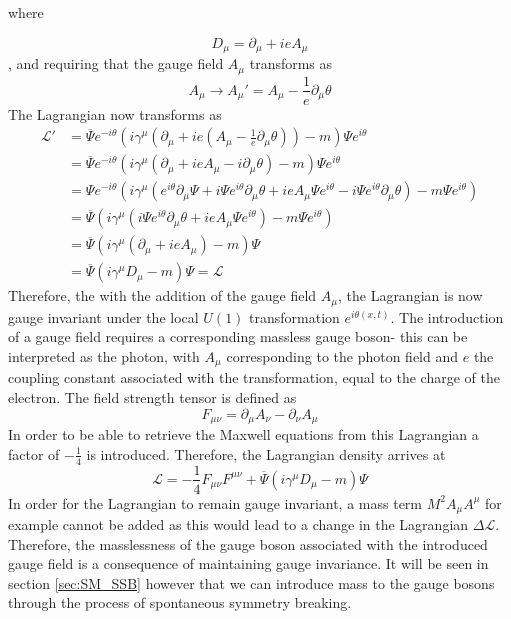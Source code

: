 \documentclass{article}
\begin{document}
where 

\begin{equation}
D_\mu = \partial_\mu + ieA_\mu
\end{equation}
, and requiring that the gauge field $A_\mu$ transforms as
\begin{equation}
A_\mu \rightarrow A_\mu' = A_\mu - \frac{1}{e}\partial_\mu \theta
\end{equation}
The Lagrangian now transforms as
\begin{equation}
\begin{split}
\mathcal{L'} &= \overline{\Psi}e^{-i\theta}(i\gamma^\mu (\partial_\mu +ie(A_\mu - \frac{1}{e}\partial_\mu \theta)) - m)\Psi e^{i\theta} \\
&= \overline{\Psi}e^{-i\theta}(i\gamma^\mu (\partial_\mu + ieA_\mu - i\partial_\mu \theta) -m)\Psi e^{i\theta} \\
&=\Psi e^{-i\theta}(i\gamma^\mu (e^{i\theta}\partial_\mu \Psi + i\Psi e^{i\theta}\partial_\mu \theta + ieA_\mu \Psi e^{i\theta} - i\Psi e^{i\theta}\partial_\mu \theta ) - m\Psi e^{i\theta}) \\
&=\overline{\Psi}(i\gamma^\mu(i\Psi e^{i\theta}\partial_\mu \theta + ieA_\mu \Psi e^{i\theta})-m\Psi e^{i\theta})\\
&=\overline{\Psi}(i\gamma^\mu(\partial_\mu +ieA_\mu) - m)\Psi \\
&=\overline{\Psi}(i\gamma^\mu D_\mu -m)\Psi = \mathcal{L}
\end{split}
\end{equation}
Therefore, the with the addition of the gauge field $A_\mu$, the Lagrangian is now gauge invariant under the local $U(1)$ transformation $e^{i\theta(x,t)}$. The introduction of a gauge field requires a corresponding massless gauge boson- this can be interpreted as the photon, with $A_\mu$ corresponding to the photon field and $e$ the coupling constant associated with the transformation, equal to the charge of the electron.
The field strength tensor is defined as 
\begin{equation}
    F_{\mu\nu} = \partial_\mu A_\nu - \partial_\nu A_\mu
\end{equation}
In order to be able to retrieve the Maxwell equations from this Lagrangian a factor of $-\frac{1}{4}$ is introduced. Therefore, the Lagrangian density arrives at
\begin{equation}
\mathcal{L} = -\frac{1}{4}F_{\mu\nu}F^{\mu\nu} + \overline{\Psi}(i\gamma^\mu D_\mu -m)\Psi
\end{equation}
In order for the Lagrangian to remain gauge invariant, a mass term $M^2A_\mu A^\mu$ for example cannot be added as this would lead to a change in the Lagrangian $\Delta \mathcal{L}$. Therefore, the masslessness of the gauge boson associated with the introduced gauge field is a consequence of maintaining gauge invariance. It will be seen in section \ref{sec:SM_SSB} however that we can introduce mass to the gauge bosons through the process of spontaneous symmetry breaking.
\end{document}
